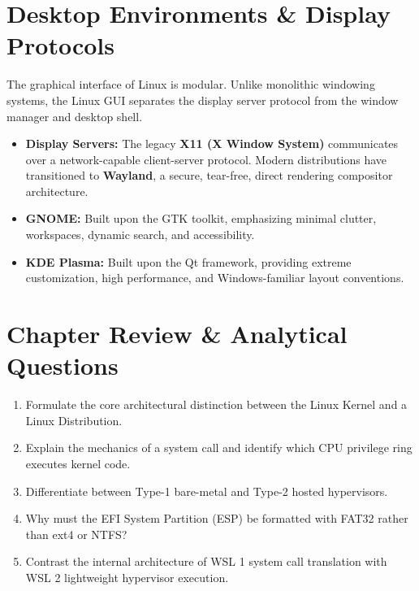 \section{Desktop Environments \& Display Protocols}
The graphical interface of Linux is modular. Unlike monolithic windowing systems, the Linux GUI separates the display server protocol from the window manager and desktop shell.
\begin{itemize}[leftmargin=1.5em]
    \item \textbf{Display Servers:} The legacy \textbf{X11 (X Window System)} communicates over a network-capable client-server protocol. Modern distributions have transitioned to \textbf{Wayland}, a secure, tear-free, direct rendering compositor architecture.
    \item \textbf{GNOME:} Built upon the GTK toolkit, emphasizing minimal clutter, workspaces, dynamic search, and accessibility.
    \item \textbf{KDE Plasma:} Built upon the Qt framework, providing extreme customization, high performance, and Windows-familiar layout conventions.
\end{itemize}

\section{Chapter Review \& Analytical Questions}
\begin{enumerate}[leftmargin=1.5em]
    \item Formulate the core architectural distinction between the Linux Kernel and a Linux Distribution.
    \item Explain the mechanics of a system call and identify which CPU privilege ring executes kernel code.
    \item Differentiate between Type-1 bare-metal and Type-2 hosted hypervisors.
    \item Why must the EFI System Partition (ESP) be formatted with FAT32 rather than ext4 or NTFS?
    \item Contrast the internal architecture of WSL 1 system call translation with WSL 2 lightweight hypervisor execution.
\end{enumerate}
